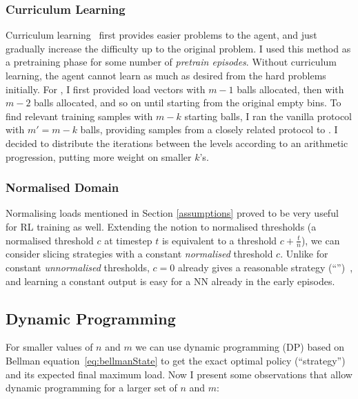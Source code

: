 \subsubsection*{Curriculum Learning}


Curriculum learning~\cite{bengio2009curriculumoriginal} first provides easier problems to the agent, and just gradually increase the difficulty up to the original problem. I used this method as a pretraining phase for some number of \textit{pretrain episodes}. Without curriculum learning, the agent cannot learn as much as desired from the hard problems initially. For \TwoThinning, I first provided load vectors with $m-1$ balls allocated, then with $m-2$ balls allocated, and so on until starting from the original empty bins. To find relevant training samples with $m-k$ starting balls, I ran the vanilla \OneChoice protocol with $m'=m-k$ balls, providing samples from a closely related protocol to \TwoThinning. I decided to distribute the iterations between the levels according to an arithmetic progression, putting more weight on smaller $k$'s.



\subsubsection*{Normalised Domain} \label{normalised-domain}

Normalising loads mentioned in Section \ref{assumptions} proved to be very useful for RL training as well. Extending the notion to normalised thresholds (a normalised threshold $c$ at timestep $t$ is equivalent to a threshold $c+\frac{t}{n}$), we can consider slicing strategies with a constant \textit{normalised} threshold $c$. Unlike for constant \textit{unnormalised} thresholds, $c=0$ already gives a reasonable strategy (``\MeanThinning'')~\cite{los2022cachingpackingthinningtwinning}, and learning a constant output is easy for a NN already in the early episodes.


\subsection{Dynamic Programming} \label{two-thinning-dp}


For smaller values of $n$ and $m$ we can use dynamic programming (DP) based on Bellman equation~\eqref{eq:bellmanState} to get the exact optimal policy (``\DP strategy'') and its expected final maximum load. Now I present some observations that allow dynamic programming for a larger set of $n$ and $m$:


